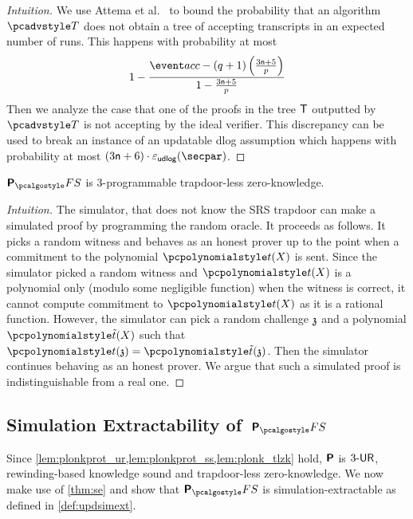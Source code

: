 \begin{proof}[Intuition]
  We use Attema et al.~\cite[Proposition 2]{EPRINT:AttFehKlo21} to bound the probability that an algorithm $\tdv$ does not obtain a tree of accepting transcripts in an expected number of runs. This happens with probability at most
  \[
    1 - \frac{\accProb - (q + 1) \left(\frac{3 \noofc + 5}{p} \right)}{1 - \frac{3 \noofc + 5}{p}}
  \]
  Then we analyze the case that one of the proofs in the tree $\mathsf{T}$ outputted by $\tdv$ is not accepting by the ideal verifier. This discrepancy can be used to break an instance of an updatable dlog assumption which happens with probability at most $(3 \noofc + 6)  \cdot \epsudlog (\secpar)$. %
 \end{proof}
  

\begin{lemma}
  \label{lem:plonk_tlzk}
  $\plonkprotfs$ is 3-programmable trapdoor-less zero-knowledge.
\end{lemma}

\begin{proof}[Intuition]
  The simulator, that does not know the SRS trapdoor can make a simulated proof by programming the random oracle. It proceeds as follows. It picks a random witness and behaves as an honest prover up to the point when a commitment to the polynomial $\p{t}(X)$ is sent. Since the simulator picked a random witness and $\p{t}(X)$ is a polynomial only (modulo some negligible function) when the witness is correct, it cannot compute commitment to $\p{t}(X)$ as it is a rational function. However, the simulator can pick a random challenge $\mathfrak{z}$ and a polynomial $\p{\tilde{t}}(X)$ such that $\p{t} (\chz)  = \p{\tilde{t}} (\chz)$. Then the simulator continues behaving as an honest prover. We argue that such a simulated proof is indistinguishable from a real one.
\end{proof}

\subsection*{Simulation Extractability of~$\plonkprotfs$}
Since \cref{lem:plonkprot_ur,lem:plonkprot_ss,lem:plonk_tlzk} hold, $\bm{\mathsf{P}}$ is ${3\text{-}\mathsf{UR}}$,
rewinding-based knowledge sound and trapdoor-less zero-knowledge. We now make use of \cref{thm:se} and show that
$\plonkprot_\fs$ is simulation-extractable as defined in \cref{def:updsimext}.

